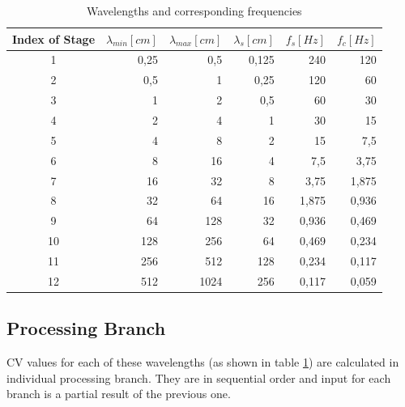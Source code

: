 \documentclass[twoside]{ctuthesis}
\theoremstyle{plain}
\theoremstyle{definition}
\theoremstyle{note}
\begin{document}
\begin{table}[htbp]
	\centering
	\caption{Wavelengths and corresponding frequencies}
	\begin{tabular}{crrrrr}
		\toprule
		Index of Stage & $\lambda_{min} [cm]$ & $\lambda_{max} [cm]$ & $\lambda_{s} [cm]$ & $f_s [Hz]$ & $f_c [Hz]$ \\
		\midrule
		1     & 0,25  & 0,5   & 0,125 & 240   & 120 \\
		2     & 0,5   & 1     & 0,25  & 120   & 60 \\
		3     & 1     & 2     & 0,5   & 60    & 30 \\
		4     & 2     & 4     & 1     & 30    & 15 \\
		5     & 4     & 8     & 2     & 15    & 7,5 \\
		6     & 8     & 16    & 4     & 7,5   & 3,75 \\
		7     & 16    & 32    & 8     & 3,75  & 1,875 \\
		8     & 32    & 64    & 16    & 1,875 & 0,936 \\
		9     & 64    & 128   & 32    & 0,936 & 0,469 \\
		10    & 128   & 256   & 64    & 0,469 & 0,234 \\
		11    & 256   & 512   & 128   & 0,234 & 0,117\\
		12    & 512   & 1024  & 256   & 0,117 & 0,059 \\
		
		\bottomrule
	\end{tabular}%
	\label{tab:Wavelengths}%
\end{table}%

\subsection{Processing Branch}
\label{processingBranch_sliver}
CV values for each of these wavelengths (as shown in table \ref{tab:Wavelengths}) are calculated in individual processing branch. They are in sequential order and input for each branch is a partial result of the previous one.
\end{document}
